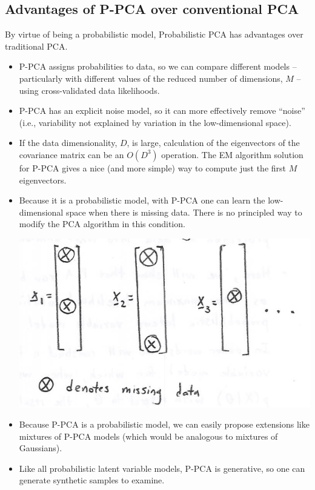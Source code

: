 \documentclass[11pt]{article}
\begin{document}
\subsection{Advantages of P-PCA over conventional PCA}
By virtue of being a probabilistic model, Probabilistic PCA has advantages over
traditional PCA.
\begin{itemize}
  \item P-PCA assigns probabilities to data, so we can compare different models --
  particularly with different values of the reduced number of dimensions, $M$ --
  using cross-validated data likelihoods.

  \item P-PCA has an explicit noise model, so it can more effectively remove
  ``noise'' (i.e., variability not explained by variation in the low-dimensional
  space).

  \item If the data dimensionality, $D$, is large, calculation of the
  eigenvectors of the covariance matrix can be an $O(D^3)$ operation. The
  EM algorithm solution for P-PCA gives a nice (and more simple) way to
  compute just the first $M$ eigenvectors.

  \item Because it is a probabilistic model, with P-PCA one can learn the
  low-dimensional space when there is missing data. There is no principled way
  to modify the PCA algorithm in this condition.
  \begin{center}
    \includegraphics[scale=0.5]{MissingData.png}
  \end{center}

  \item Because P-PCA is a probabilistic model, we can easily propose extensions
  like mixtures of P-PCA models (which would be analogous to mixtures of
  Gaussians).

  \item Like all probabilistic latent variable models, P-PCA is generative,
  so one can generate synthetic samples to examine.
\end{itemize}
\end{document}
